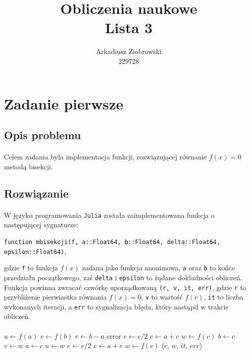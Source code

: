 \documentclass[a4paper]{article}
\title{\huge
  Obliczenia naukowe \\
  \large Lista 3}
\author{Arkadiusz Ziobrowski \\ 229728}
\date{}
\begin{document}
\maketitle

\pagebreak




\section{Zadanie pierwsze}

\subsection{Opis problemu}
\paragraph{}
Celem zadania była implementacja funkcji, rozwiązującej równanie $f(x) = 0$ metodą bisekcji.
\subsection{Rozwiązanie}
\paragraph{}
W języku programowania \texttt{Julia} została zaimplementowana funkcja o następującej sygnaturze:
\begin{center}
\texttt{function mbisekcji(f, a::Float64, b::Float64, delta::Float64, epsilon::Float64)},
\end{center}

gdzie \texttt{f} to funkcja $f(x)$ zadana jako funkcja anonimowa, \texttt{a} oraz \texttt{b} to końce przedziału początkowego, zaś \texttt{delta} i \texttt{epsilon} to żądane dokładności obliczeń. Funkcja powinna zwracać czwórkę uporządkowaną \texttt{(r, v, it, err)}, gdzie \texttt{r} to przybliżenie pierwiastka równania $f(x) = 0$, \texttt{v} to wartość $f(r)$, \texttt{it} to liczba wykonanych iteracji, a \texttt{err} to sygnalizacja błędu, który nastąpił w trakcie obliczeń.

\paragraph{}
\begin{center}
	\begin{algorithmic}[1]
    	\State $u\gets f(a)$
    	\State $v\gets f(b)$
    	\State $e\gets b - a$
    		\State \Return error
    	\EndIf
    	\State $e\gets e / 2$
    	\State $c\gets a + e$
    	\State $w\gets f(c)$
    			\State $b\gets c$
    			\State $v\gets w$
    		\Else
    			\State $a\gets c$
    			\State $u\gets w$
    		\EndIf
    		\State $e\gets e / 2$
    		\State $c\gets a + e$
    		\State $w\gets f(c)$
    	\EndWhile
    	\State \Return ($c$, $w$, $it$, $err$)
	\EndFunction
	\end{algorithmic}
\end{center}
\end{document}
